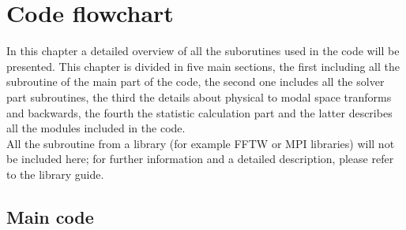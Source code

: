 \chapter{Code flowchart}
\label{chap: flowchart}
In this chapter a detailed overview of all the suborutines used in the code will be presented. This chapter is divided in five main sections, the first including all the subroutine of the main part of the code, the second one includes all the solver part subroutines, the third the details about physical to modal space tranforms and backwards,  the fourth the statistic calculation part and the latter describes all the modules included in the code.\\
All the subroutine from a library (for example FFTW or MPI libraries) will not be included here; for further information and a detailed description, please refer to the library guide.

\section{Main code}


